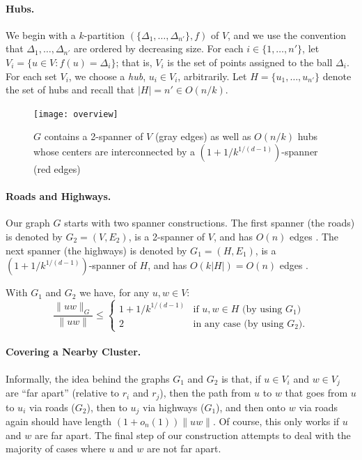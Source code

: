 \documentclass{patmorin}
\begin{document}
\paragraph{Hubs.}

We begin with a $k$-partition $(\{\Delta_1,\ldots,\Delta_{n'}\},f)$
of $V$, and we use the convention that $\Delta_1,\ldots,\Delta_{n'}$
are ordered by decreasing size.  For each $i\in \{1,\ldots,n'\}$,
let $V_i=\{u\in V : f(u)=\Delta_i\}$; that is, $V_i$ is the set of
points assigned to the ball $\Delta_i$.  For each set $V_i$, we choose
a \emph{hub}, $u_i\in V_i$, arbitrarily. Let $H=\{u_1,\ldots,u_{n'}\}$ denote
the set of hubs and recall that $|H|=n'\in O(n/k)$.

\begin{figure}
  \begin{center} 
    \texttt{[image: overview]}
  \end{center} 
  \caption{$G$ contains a 2-spanner of $V$ (gray edges) as well as
    $O(n/k)$ hubs whose centers are interconnected by a
    $(1+1/k^{1/(d-1)})$-spanner (red edges)}
\end{figure}

\paragraph{Roads and Highways.}

Our graph $G$ starts with two spanner constructions.
The first spanner (the roads) is denoted by
$G_2=(V,E_2)$, is a 2-spanner of $V$, and has $O(n)$ edges
\cite{callahan.kosaraju:faster,salowe:constructing,vaidya:sparse}.
The next spanner (the highways) is denoted by $G_1=(H,E_1)$, is a
$(1+1/k^{1/(d-1)})$-spanner of $H$, and has $O(k|H|)=O(n)$ edges
\cite{carmi.smid:optimal,ruppert.seidel:approximating}.

With $G_1$ and $G_2$ we have, for any $u,w\in V$:
\[
   \frac{\|uw\|_G}{\|uw\|} \le \begin{cases}
         1+1/k^{1/(d-1)} & \text{if $u,w\in H$ (by using $G_1$)} \\
         2 & \text{in any case (by using $G_2$).}
       \end{cases}
\]

\paragraph{Covering a Nearby Cluster.}

Informally, the idea behind the graphs $G_1$ and $G_2$ is that, if
$u\in V_i$ and $w\in V_j$ are ``far apart'' (relative to $r_i$
and $r_j$), then the path from $u$ to $w$ that goes from $u$ to $u_i$
via roads ($G_2$), then to $u_j$ via highways ($G_1$), and then onto
$w$ via roads again should have length $(1+o_n(1))\|uw\|$.  Of course,
this only works if $u$ and $w$ are far apart.  The final step of
our construction attempts to deal with the majority of cases where $u$
and $w$ are not far apart.
\end{document}

